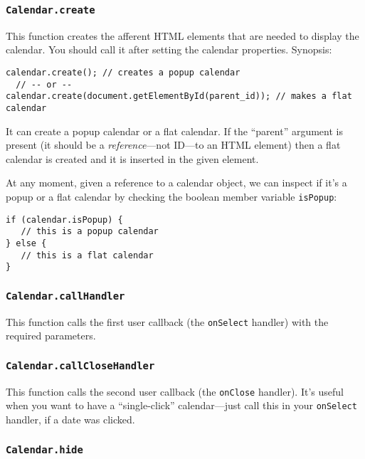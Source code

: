 \documentclass[a4paper,10pt]{article}
\begin{document}
\subsubsection{\texttt{Calendar.create}}\label{sec:Calendar.create}

This function creates the afferent HTML elements that are needed to display the
calendar.  You should call it after setting the calendar properties.  Synopsis:
\begin{verbatim}
calendar.create(); // creates a popup calendar
  // -- or --
calendar.create(document.getElementById(parent_id)); // makes a flat calendar
\end{verbatim}

It can create a popup calendar or a flat calendar.  If the ``parent'' argument
is present (it should be a \emph{reference}---not ID---to an HTML element) then
a flat calendar is created and it is inserted in the given element.

At any moment, given a reference to a calendar object, we can inspect if it's a
popup or a flat calendar by checking the boolean member variable
\texttt{isPopup}:

\begin{verbatim}
if (calendar.isPopup) {
   // this is a popup calendar
} else {
   // this is a flat calendar
}
\end{verbatim}

\subsubsection{\texttt{Calendar.callHandler}}\label{sec:Calendar.callHandler}

This function calls the first user callback (the
\texttt{onSelect} handler) with the required parameters.

\subsubsection{\texttt{Calendar.callCloseHandler}}\label{sec:Calendar.callCloseHandler}

This function calls the second user callback (the
\texttt{onClose} handler).  It's useful when you want to have a
``single-click'' calendar---just call this in your \texttt{onSelect} handler,
if a date was clicked.

\subsubsection{\texttt{Calendar.hide}}\label{sec:Calendar.hide}
\end{document}

